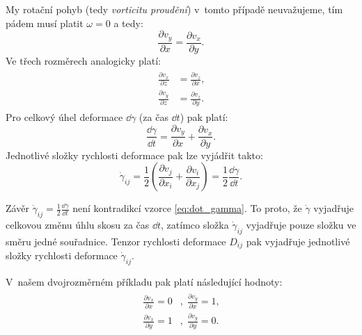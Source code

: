 \documentclass[12pt]{article}
\begin{document}
My rotační pohyb (tedy \emph{vorticitu proudění}) v~tomto případě neuvažujeme, tím pádem musí platit $\omega = 0$ a tedy:
\begin{equation}
    \frac{\partial v_y}{\partial x} = \frac{\partial v_x}{\partial y}\text{.}
\end{equation}
Ve třech rozměrech analogicky platí:
\begin{align}
    \begin{split}
        \frac{\partial v_x}{\partial z} &= \frac{\partial v_z}{\partial x}\text{,}\\
        \frac{\partial v_y}{\partial z} &= \frac{\partial v_z}{\partial y}\text{.}
    \end{split}
\end{align}
Pro celkový úhel deformace $\dd\gamma$ (za čas $\dd t$) pak platí:
\begin{equation}
    \frac{\dd\gamma}{\dd t} = \frac{\partial v_y}{\partial x} + \frac{\partial v_x}{\partial y}\text{.}
    \label{eq:gradient_gamma}
\end{equation}
Jednotlivé složky rychlosti deformace pak lze vyjádřit takto:~\cite{online:Skripta_rychlost_deformace}\cite{wiki:Simple_shear}\cite{wiki:Infinitesimal_strain_theory}\cite{wiki:Deformace}
\begin{equation}
    \dot\gamma_{ij} = \frac{1}{2}\left(\frac{\partial v_j}{\partial x_i} + \frac{\partial v_i}{\partial x_j}\right) = \frac{1}{2}\frac{\dd\gamma}{\dd t}\text{.}
    \label{eq:rychlost_deformace}
\end{equation}
\par
Závěr $\dot\gamma_{ij} = \frac{1}{2}\frac{\dd\gamma}{\dd t}$ není kontradikcí vzorce \ref{eq:dot_gamma}. To proto, že $\dot\gamma$ vyjadřuje celkovou změnu úhlu skosu za čas $\dd t$, zatímco složka $\dot\gamma_{ij}$ vyjadřuje pouze složku ve směru jedné souřadnice. Tenzor rychlosti deformace $D_{ij}$ pak vyjadřuje jednotlivé složky rychlosti deformace $\dot\gamma_{ij}$.~\cite{YT:Kinematics_of_fluids_elements}\cite{online:Skripta_deformace}\cite{online:Skripta_viskozni_latky}\cite{wiki:Strain_mechanics}\cite{wiki:Infinitesimal_strain_theory}\cite{wiki:Simple_shear}
\par
V~našem dvojrozměrném příkladu pak platí následující hodnoty:
\begin{align}
    \begin{split}
        \frac{\partial v_x}{\partial x} = 0&, \;
        \frac{\partial v_y}{\partial x} = 1 \text{,}\\
        \frac{\partial v_x}{\partial y} = 1&, \;
        \frac{\partial v_y}{\partial y} = 0 \text{.}
    \end{split}
\end{align}
\end{document}
